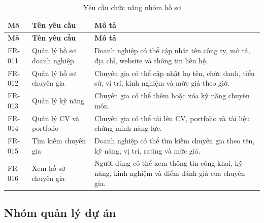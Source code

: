\begin{longtable}{|p{2.0cm}|p{4.2cm}|p{7.6cm}|}
\caption{Yêu cầu chức năng nhóm hồ sơ}
\label{tab:fr-profile} \\ \hline
\textbf{Mã} & \textbf{Tên yêu cầu} & \textbf{Mô tả} \\ \hline
\endfirsthead
\hline
\textbf{Mã} & \textbf{Tên yêu cầu} & \textbf{Mô tả} \\ \hline
\endhead

FR-011 & Quản lý hồ sơ doanh nghiệp & Doanh nghiệp có thể cập nhật tên công ty, mô tả, địa chỉ, website và thông tin liên hệ. \\ \hline
FR-012 & Quản lý hồ sơ chuyên gia & Chuyên gia có thể cập nhật họ tên, chức danh, tiểu sử, vị trí, kinh nghiệm và mức giá theo giờ. \\ \hline
FR-013 & Quản lý kỹ năng & Chuyên gia có thể thêm hoặc xóa kỹ năng chuyên môn. \\ \hline
FR-014 & Quản lý CV và portfolio & Chuyên gia có thể tải lên CV, portfolio và tài liệu chứng minh năng lực. \\ \hline
FR-015 & Tìm kiếm chuyên gia & Doanh nghiệp có thể tìm kiếm chuyên gia theo tên, kỹ năng, vị trí, rating và mức giá. \\ \hline
FR-016 & Xem hồ sơ chuyên gia & Người dùng có thể xem thông tin công khai, kỹ năng, kinh nghiệm và điểm đánh giá của chuyên gia. \\ \hline
\end{longtable}

\subsection{Nhóm quản lý dự án}


